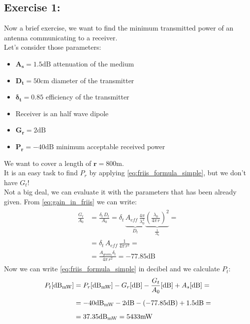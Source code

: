 \subsection*{Exercise 1:}
Now a brief exercise, we want to find the minimum transmitted power of an antenna communicating to a receiver.\\
Let's consider those parameters:
\begin{itemize}
    \item $\bm{A_s} =1.5\si{\deci\bel}$ attenuation of the medium
    \item $\bm{D_t} =50\si{\centi\metre}$ diameter of the transmitter
    \item $\bm{\delta_t} =0.85$ efficiency of the transmitter
    \bigskip
    \item Receiver is an half wave dipole
    \item $\bm{G_r} =2\si{\deci\bel}$
    \item $\bm{P_r} =-40\si{\deci\bel}$ minimum acceptable received power
\end{itemize}
We want to cover a length of $\bm{r} =800\si{\metre}$.\\
It is an easy task to find $P_r$ by applying \cref{eq:friis_formula_simple}, but we don't have $G_t$!\\
Not a big deal, we can evaluate it with the parameters that has been already given. From \cref{eq:gain_in_friis} we can write:
\begin{align*}
    \begin{split}
        \frac{G_t}{A_0}&=\frac{\delta_t\,D_t}{A_0}=\delta_t\,\underbrace{A_{eff}\,\frac{4\pi}{\lambda_0^2}}_{D_t}\underbrace{\left(\frac{\lambda_0}{4\pi\,r}\right)^2}_\frac{1}{A_0}=\\[5pt]
        &=\delta_t\,A_{eff}\,\frac{1}{4\pi\,r^2}=\\[5pt]
        &=\frac{A_{geom_t}\delta_t}{4\pi\,r^2}=-77.85\si{\deci\bel}
    \end{split}
\end{align*}
Now we can write \cref{eq:friis_formula_simple} in decibel and we calculate $P_t$:
\begin{align*}
    \begin{split}
    P_t[\si{\deci\bel_{\milli\watt}}]&=P_r[\si{\deci\bel_{\milli\watt}}]-G_r[\si{\deci\bel}]-\frac{G_t}{A_0}[\si{\deci\bel}]+A_s[\si{\deci\bel}]=\\[5pt]
    &=-40\si{\deci\bel_{\milli\watt}}-2\si{\deci\bel}-(-77.85\si{\deci\bel})+1.5\si{\deci\bel}=\\[5pt]
    &=37.35\si{\deci\bel_{\milli\watt}}=5433\si{\milli\watt}
    \end{split}
\end{align*}
